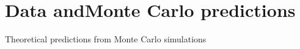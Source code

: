 \section{Data andMonte Carlo predictions}
\label{sec:montecarlopred}

Theoretical predictions from Monte Carlo simulations
